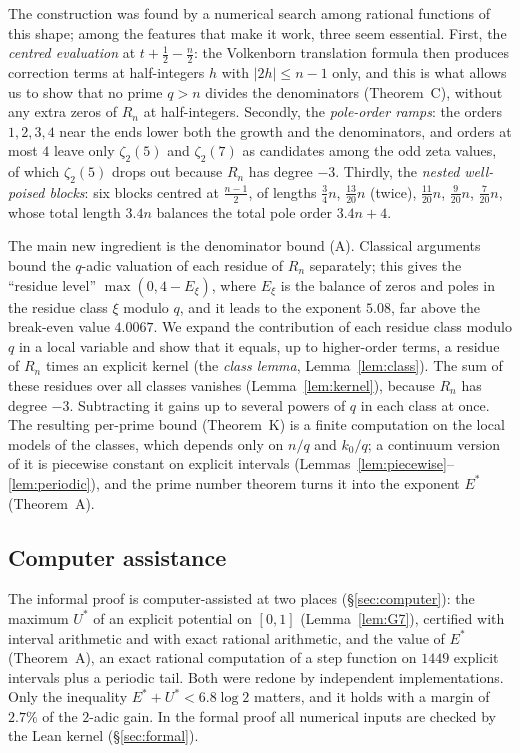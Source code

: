 \documentclass{amsart}
\theoremstyle{definition}
\theoremstyle{remark}
\numberwithin{equation}{section}
\begin{document}
The construction was found by a numerical search among rational functions of
this shape; among the features that make it work, three seem essential. First,
the \emph{centred evaluation} at $t+\frac12-\frac n2$: the Volkenborn
translation formula then produces correction terms at half-integers $h$ with
$|2h|\le n-1$ only, and this is what allows us to show that no prime $q>n$
divides the denominators (Theorem~C), without any extra zeros of $R_n$ at
half-integers.
Secondly, the \emph{pole-order ramps}: the orders $1,2,3,4$ near the ends
lower both the growth and the denominators, and orders at most $4$ leave only
$\zeta_2(5)$ and $\zeta_2(7)$ as candidates among the odd zeta values, of
which $\zeta_2(5)$ drops out because $R_n$ has degree $-3$. Thirdly, the \emph{nested well-poised blocks}: six blocks
centred at $\frac{n-1}2$, of lengths $\frac34n$, $\frac{13}{20}n$ (twice),
$\frac{11}{20}n$, $\frac9{20}n$, $\frac7{20}n$, whose total length $3.4n$
balances the total pole order $3.4n+4$.

The main new ingredient is the denominator bound (A). Classical arguments
bound the $q$-adic valuation of each residue of $R_n$ separately; this gives
the ``residue level'' $\max(0,4-E_\xi)$, where $E_\xi$ is the balance of zeros
and poles in the residue class $\xi$ modulo $q$, and it leads to the
exponent $5.08$, far above the break-even value $4.0067$. We expand the
contribution of each residue class modulo $q$ in a local variable and show
that it equals, up to higher-order terms, a residue of $R_n$ times an explicit
kernel (the \emph{class lemma}, Lemma~\ref{lem:class}). The sum of these
residues over all classes vanishes (Lemma~\ref{lem:kernel}), because $R_n$
has degree $-3$. Subtracting it gains up to several powers of $q$ in each
class at once. The resulting per-prime bound (Theorem~K) is a finite
computation on the local models of the classes, which depends only on
$n/q$ and $k_0/q$; a continuum version of it is piecewise constant on
explicit intervals (Lemmas~\ref{lem:piecewise}--\ref{lem:periodic}), and the
prime number theorem turns it into the exponent $E^*$ (Theorem~A).

\subsection{Computer assistance}\label{ss:intro-computer}

The informal proof is computer-assisted at two places (\S\ref{sec:computer}):
the maximum $U^*$ of an explicit potential on $[0,1]$ (Lemma~\ref{lem:G7}),
certified with interval arithmetic and with exact rational arithmetic, and the
value of $E^*$ (Theorem~A), an exact rational computation of a step function
on $1449$ explicit intervals plus a periodic tail. Both were redone by
independent implementations. Only the inequality $E^*+U^*<6.8\log2$ matters,
and it holds with a margin of $2.7\%$ of the $2$-adic gain. In the formal
proof all numerical inputs are checked by the Lean kernel
(\S\ref{sec:formal}).
\end{document}
